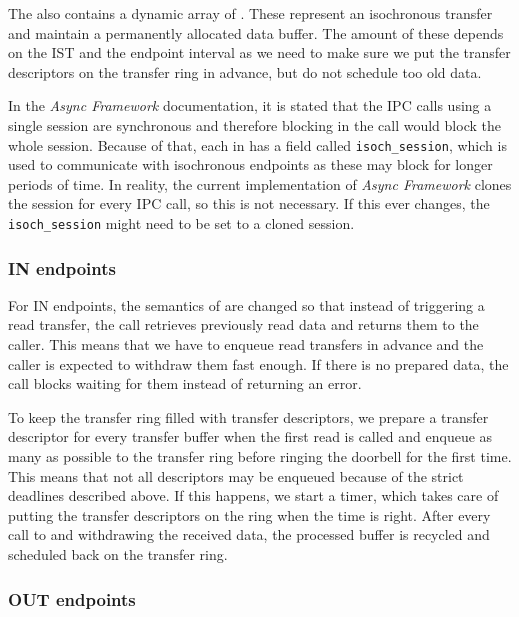 The  also contains a dynamic array of
. These represent an isochronous transfer and
maintain a permanently allocated data buffer. The amount of these depends on
the IST and the endpoint interval as we need to make sure we put the transfer
descriptors on the transfer ring in advance, but do not schedule too old data.

In the \textit{Async Framework} documentation, it is stated that the IPC calls
using a single session are synchronous and therefore blocking in the call would
block the whole session. Because of that, each  in
 has a field called \texttt{isoch\_session}, which is used to
communicate with isochronous endpoints as these may block for longer periods of
time. In reality, the current implementation of \textit{Async Framework} clones
the session for every IPC call, so this is not necessary. If this ever changes,
the \texttt{isoch\_session} might need to be set to a cloned session.

\subsubsection{IN endpoints}

For IN endpoints, the semantics of  are changed so that instead
of triggering a read transfer, the call retrieves previously read data and
returns them to the caller. This means that we have to enqueue read transfers
in advance and the caller is expected to withdraw them fast enough. If there is
no prepared data, the call blocks waiting for them instead of returning an
error.

To keep the transfer ring filled with transfer descriptors, we prepare a
transfer descriptor for every transfer buffer when the first read is called and
enqueue as many as possible to the transfer ring before ringing the doorbell
for the first time. This means that not all descriptors may be enqueued because
of the strict deadlines described above. If this happens, we start a timer,
which takes care of putting the transfer descriptors on the ring when the time
is right. After every call to  and withdrawing the received data,
the processed buffer is recycled and scheduled back on the transfer ring.

\subsubsection{OUT endpoints}

